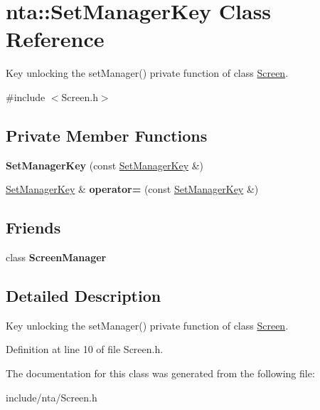 \hypertarget{classnta_1_1SetManagerKey}{}\section{nta\+:\+:Set\+Manager\+Key Class Reference}
\label{classnta_1_1SetManagerKey}


Key unlocking the set\+Manager() private function of class \hyperlink{classnta_1_1Screen}{Screen}.  




{\ttfamily \#include $<$Screen.\+h$>$}

\subsection*{Private Member Functions}
\begin{DoxyCompactItemize}
\item 
\mbox{\label{classnta_1_1SetManagerKey_a39cf977d72e792fd57d861e46ff0de5a}} 
{\bfseries Set\+Manager\+Key} (const \hyperlink{classnta_1_1SetManagerKey}{Set\+Manager\+Key} \&)
\item 
\mbox{\label{classnta_1_1SetManagerKey_a2827a71fc493a6c61697c42dc999389e}} 
\hyperlink{classnta_1_1SetManagerKey}{Set\+Manager\+Key} \& {\bfseries operator=} (const \hyperlink{classnta_1_1SetManagerKey}{Set\+Manager\+Key} \&)
\end{DoxyCompactItemize}
\subsection*{Friends}
\begin{DoxyCompactItemize}
\item 
\mbox{\label{classnta_1_1SetManagerKey_a888edc649fed896d28811ec69f3f2066}} 
class {\bfseries Screen\+Manager}
\end{DoxyCompactItemize}


\subsection{Detailed Description}
Key unlocking the set\+Manager() private function of class \hyperlink{classnta_1_1Screen}{Screen}. 

Definition at line 10 of file Screen.\+h.



The documentation for this class was generated from the following file\+:\begin{DoxyCompactItemize}
\item 
include/nta/Screen.\+h\end{DoxyCompactItemize}
